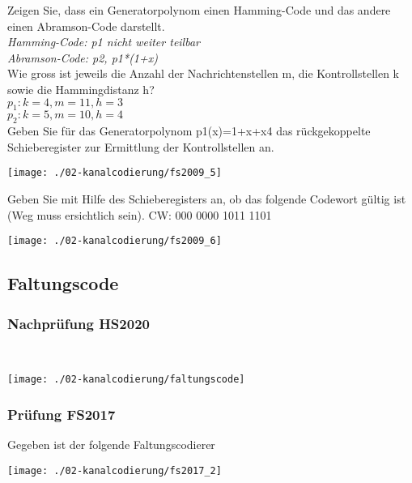 Zeigen Sie, dass ein Generatorpolynom einen Hamming-Code und das andere einen Abramson-Code darstellt.\\
\textit{Hamming-Code: p1 nicht weiter teilbar}\\
\textit{Abramson-Code: p2, p1*(1+x)}\\

Wie gross ist jeweils die Anzahl der Nachrichtenstellen m, die Kontrollstellen k sowie die Hammingdistanz h?\\
$p_1: k=4, m=11, h=3$\\
$p_2: k=5, m=10, h=4$\\

Geben Sie für das Generatorpolynom p1(x)=1+x+x4 das rückgekoppelte Schieberegister zur Ermittlung der Kontrollstellen an.
\begin{center}
    \vspace{-8pt}
    \texttt{[image: ./02-kanalcodierung/fs2009\_5]}
    \vspace{-8pt}
\end{center}

Geben Sie mit Hilfe des Schieberegisters an, ob das folgende Codewort gültig ist (Weg muss ersichtlich sein). CW: 000 0000 1011 1101
\begin{center}
    \vspace{-8pt}
    \texttt{[image: ./02-kanalcodierung/fs2009\_6]}
    \vspace{-8pt}
\end{center}

\columnbreak

\subsection{Faltungscode}
\subsubsection{Nachprüfung HS2020}\mbox{}\\
\begin{center}
    \vspace{-8pt}
    \texttt{[image: ./02-kanalcodierung/faltungscode]}
    \vspace{-8pt}
\end{center}

\subsubsection{Prüfung FS2017}
Gegeben ist der folgende Faltungscodierer
\begin{center}
    \vspace{-8pt}
    \texttt{[image: ./02-kanalcodierung/fs2017\_2]}
    \vspace{-8pt}
\end{center}

